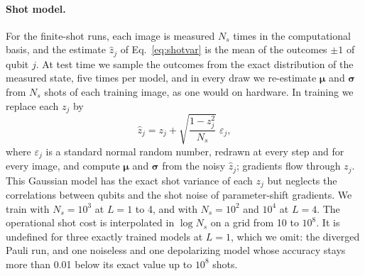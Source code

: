 \documentclass[
 aps,pra,
 twocolumn,
 superscriptaddress,
 longbibliography,
 nofootinbib
]{revtex4-2}
\begin{document}
\paragraph{Shot model.}
For the finite-shot runs, each image is measured $N_s$ times in the
computational basis, and the estimate $\hat z_j$ of Eq.~\eqref{eq:shotvar} is the
mean of the outcomes $\pm1$ of qubit $j$. At test time we sample the outcomes from the exact distribution of
the measured state, five times per model, and in every draw we re-estimate
$\boldsymbol\mu$ and $\boldsymbol\sigma$ from $N_s$ shots of each training
image, as one would on hardware. In training we replace each $z_j$ by
\begin{equation}
\hat z_j=z_j+\sqrt{\frac{1-z_j^2}{N_s}}\;\varepsilon_j ,
\label{eq:shot_train}
\end{equation}
where $\varepsilon_j$ is a standard normal random number, redrawn at every step
and for every image, and compute $\boldsymbol\mu$ and
$\boldsymbol\sigma$ from the noisy $\hat z_j$; gradients flow through $z_j$. This
Gaussian model has the exact shot variance of each $z_j$ but neglects the
correlations between qubits and the shot noise of parameter-shift gradients. We train with
$N_s=10^3$ at $L=1$ to 4, and with $N_s=10^2$ and $10^4$ at $L=4$. The
operational shot cost is interpolated in $\log N_s$ on a grid from 10 to
$10^8$. It is undefined for three exactly trained models at $L=1$, which we
omit: the diverged Pauli run, and one noiseless and one depolarizing model
whose accuracy stays more than 0.01 below its exact value up to $10^8$ shots.
\end{document}
